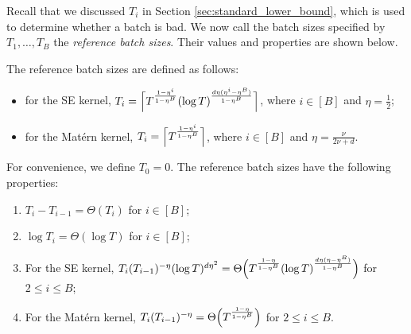 \documentclass[10pt]{article}
\begin{document}
Recall that we discussed $T_i$ in Section \ref{sec:standard_lower_bound}, which is used to determine whether a batch is bad. We now call the batch sizes specified by $T_1,\ldots, T_B$ the \emph{reference batch sizes}. Their values and properties are shown below.

\begin{proposition}
    \label{prop:reference_batches_property}
    The reference batch sizes are defined as follows:
    \begin{itemize}
        \item for the SE kernel, $T_i = \Bigl\lceil T^{\frac{1-\eta^i}{1-\eta^B}}(\log T)^{\frac{d\eta(\eta^i- \eta^B)}{1-\eta^B}}\Bigr\rceil$, where $i\in [B]$ and $\eta=\frac{1}{2}$;
        \item for the Mat\'ern kernel, $T_i = \Bigl\lceil T^{\frac{1-\eta^i}{1-\eta^B}}\Bigr\rceil$, where $i\in [B]$ and $\eta=\frac{\nu}{2\nu+d}$.
    \end{itemize}
    For convenience, we define $T_0=0$. 
    The reference batch sizes have the following properties:
    \begin{enumerate}
        \item $T_i-T_{i-1}=\Theta(T_i)$ for $i \in [B]$;
        \item $\log T_i=\Theta(\log T)$ for $i \in [B]$;
        \item For the SE kernel, $T_i(T_{i-1})^{-\eta}(\log T)^{d\eta^2}=\Theta\Bigl(T^{\frac{1-\eta}{1-\eta^B}}(\log T)^{\frac{d\eta(\eta-\eta^B)}{1-\eta^B}}\Bigr)$ for $2 \leq i \leq B$;
        \item For the Mat\'ern kernel, $T_i(T_{i-1})^{-\eta}=\Theta\Bigl(T^{\frac{1-\eta}{1-\eta^B}}\Bigr)$ for $2 \leq i \leq B$.
    \end{enumerate}
\end{proposition}
\end{document}
